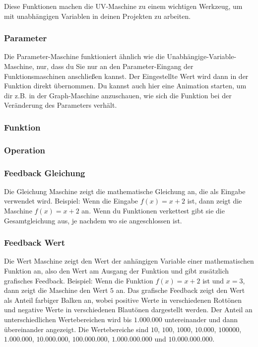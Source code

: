 \documentclass[12pt]{report}
\begin{document}
Diese Funktionen machen die UV-Maschine zu einem wichtigen Werkzeug, um mit unabhängigen Variablen in deinen Projekten zu arbeiten.
\subsubsection{Parameter}
Die Parameter-Maschine funktioniert ähnlich wie die Unabhängige-Variable-Maschine, nur, dass du Sie nur an den Parameter-Eingang der Funktionsmaschinen anschließen kannst. Der Eingestellte Wert wird dann in der Funktion direkt übernommen. Du kannst auch hier eine Animation starten, um dir z.B. in der Graph-Maschine anzuschauen, wie sich die Funktion bei der Veränderung des Parameters verhält.
\subsubsection{Funktion}
\subsubsection{Operation}
\subsubsection{Feedback Gleichung}
Die Gleichung Maschine zeigt die mathematische Gleichung an, die als Eingabe verwendet wird. Beispiel: Wenn die Eingabe $f(x) = x + 2$ ist, dann zeigt die Maschine $f(x) = x + 2$ an. Wenn du Funktionen verkettest gibt sie die Gesamtgleichung aus, je nachdem wo sie angeschlossen ist.
\subsubsection{Feedback Wert}
Die Wert Maschine zeigt den Wert der anhängigen Variable einer mathematischen Funktion an, also den Wert am Ausgang der Funktion und gibt zusätzlich grafisches Feedback. 
Beispiel: Wenn die Funktion $f(x) = x + 2$ ist und $x = 3$, dann zeigt die Maschine den Wert $5$ an. 
Das grafische Feedback zeigt den Wert als Anteil farbiger Balken an, wobei positive Werte in verschiedenen Rottönen und negative Werte in verschiedenen Blautönen dargestellt werden. Der Anteil an unterschiedlichen Wertebereichen wird bis $1.000.000$ untereinander und dann übereinander angezeigt. Die Wertebereiche sind $10$, $100$, $1000$, $10.000$, $100000$, $1.000.000$, $10.000.000$, $100.000.000$, $1.000.000.000$ und $10.000.000.000$.
\end{document}
